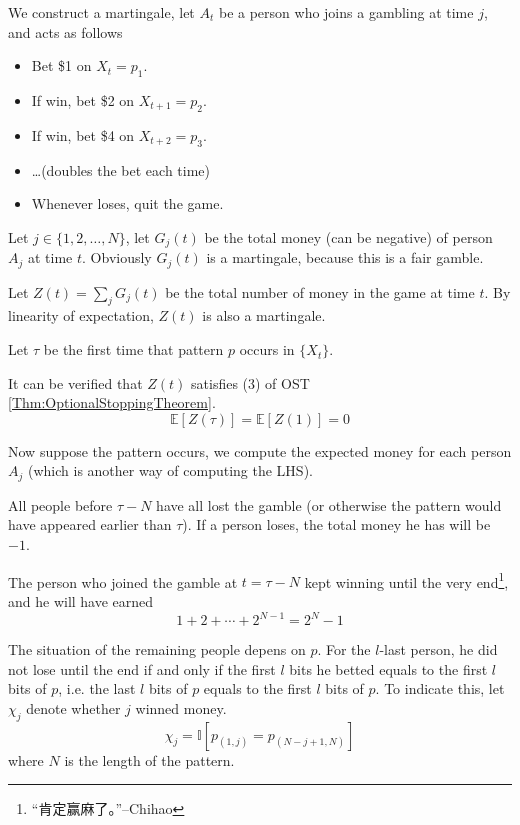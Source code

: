             We construct a martingale, let $A_t$ be a person who joins a gambling at time $j$, and acts as follows
            \begin{itemize}
                \item Bet \$1 on $X_t=p_1$.
                \item If win, bet \$2 on $X_{t+1}=p_2$.
                \item If win, bet \$4 on $X_{t+2}=p_3$.
                \item \dots (doubles the bet each time)
                \item Whenever loses, quit the game.
            \end{itemize}

            Let $j \in \{1, 2, \dots, N\}$, let $G_j(t)$ be the total money (can be negative) of person $A_j$ at time $t$. Obviously $G_j(t)$ is a martingale, because this is a fair gamble.

            Let $Z(t) = \sum_j G_j(t)$ be the total number of money in the game at time $t$. By linearity of expectation, $Z(t)$ is also a martingale.

            Let $\tau$ be the first time that pattern $p$ occurs in $\{X_t\}$.

            It can be verified that $Z(t)$ satisfies (3) of OST \ref{Thm:OptionalStoppingTheorem}.
            \[ \mathbb{E}[Z(\tau)] = \mathbb{E}[Z(1)] = 0 \]

            Now suppose the pattern occurs, we compute the expected money for each person $A_j$ (which is another way of computing the LHS).

            All people before $\tau - N$ have all lost the gamble (or otherwise the pattern would have appeared earlier than $\tau$). If a person loses, the total money he has will be $-1$. 

            The person who joined the gamble at $t = \tau-N$ kept winning until the very end\footnote{“肯定赢麻了。”--Chihao}, and he will have earned
            \[ 1 + 2 + \cdots + 2^{N-1} = 2^N-1 \]

            The situation of the remaining people depens on $p$. For the $l$-last person, he did not lose until the end if and only if the first $l$ bits he betted equals to the first $l$ bits of $p$, i.e. the last $l$ bits of $p$ equals to the first $l$ bits of $p$. To indicate this, let $\chi_j$ denote whether $j$ winned money.
            \[ \chi_j = \mathbb{I}[p_{(1,j)} = p_{(N-j+1,N)}] \]
            where $N$ is the length of the pattern.

